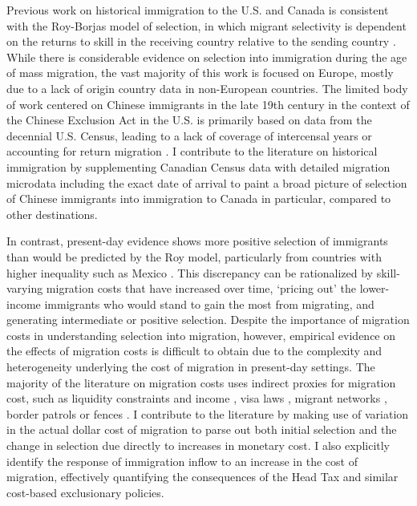 Previous work on historical immigration to the U.S. and Canada is consistent with the Roy-Borjas model of selection, in which migrant selectivity is dependent on the returns to skill in the receiving country relative to the sending country \citep{roy1951,borjas1987, Abramitzkyetal2013, abramitzkyboustan2017, connor2019}. While there is considerable evidence on selection into immigration during the age of mass migration, the vast majority of this work is focused on Europe, mostly due to a lack of origin country data in non-European countries. The limited body of work centered on Chinese immigrants in the late 19th century in the context of the Chinese Exclusion Act in the U.S. is primarily based on data from the decennial U.S. Census, leading to a lack of coverage of intercensal years or accounting for return migration \citep{Chen2015,ChenXie2020}. 
I contribute to the literature on historical immigration by supplementing Canadian Census data with detailed migration microdata including the exact date of arrival to paint a broad picture of selection of Chinese immigrants into immigration to Canada in particular, compared to other destinations.

In contrast, present-day evidence shows more positive selection of immigrants than would be predicted by the Roy model, particularly from countries with higher inequality such as Mexico \citep{chiquiarhanson2005, mckenzierapoport2010}. This discrepancy can be rationalized by skill-varying migration costs that have increased over time, `pricing out' the lower-income immigrants who would stand to gain the most from migrating, and generating intermediate or positive selection. 
Despite the importance of migration costs in understanding selection into migration, however, empirical evidence on the effects of migration costs is difficult to obtain due to the complexity and heterogeneity underlying the cost of migration in present-day settings. The majority of the literature on migration costs uses indirect proxies for migration cost, such as liquidity constraints and income \citep{Angelucci2015, cai2020}, visa laws \citep{ortegaperi2013}, migrant networks \citep{mckenzierapoport2010}, border patrols or fences \citep{hansonspilimbergo1999, angelucci2012,feigenberg2020}. I contribute to the literature by making use of variation in the actual dollar cost of migration to parse out both initial selection and the change in selection due directly to increases in monetary cost. I also explicitly identify the response of immigration inflow to an increase in the cost of migration, effectively quantifying the consequences of the Head Tax and similar cost-based exclusionary policies.



